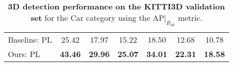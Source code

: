 \begin{table}[t!]
{\begin{tabular}{l|ccc|ccc}


\midrule
Baseline: PL &  %
25.42 &	
17.97 &	
15.22 &  
18.50 & 
12.68 & 
10.78
\\


Ours: PL &  %
\textbf{43.46} & 
\textbf{29.96} &
\textbf{25.07} &
\textbf{34.01} &
\textbf{22.31} &
\textbf{18.58} 
\\




\bottomrule
\end{tabular}\\\vspace{0mm}
\caption{
\textbf{3D detection performance on the KITTI3D validation set} for the Car category using the AP$|_{R_{40}}$ metric.}
\label{table:kitti_3d_val}
}
\end{table}